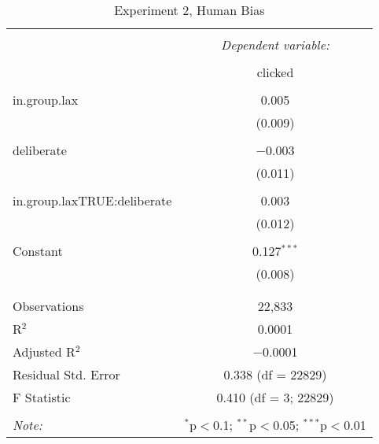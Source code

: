 
\begin{table}[!htbp] \centering 
  \caption{Experiment 2, Human Bias} 
  \label{} 
\begin{tabular}{@{\extracolsep{5pt}}lc} 
\\[-1.8ex]\hline 
\hline \\[-1.8ex] 
 & \multicolumn{1}{c}{\textit{Dependent variable:}} \\ 
\cline{2-2} 
\\[-1.8ex] & clicked \\ 
\hline \\[-1.8ex] 
 in.group.lax & 0.005 \\ 
  & (0.009) \\ 
  & \\ 
 deliberate & $-$0.003 \\ 
  & (0.011) \\ 
  & \\ 
 in.group.laxTRUE:deliberate & 0.003 \\ 
  & (0.012) \\ 
  & \\ 
 Constant & 0.127$^{***}$ \\ 
  & (0.008) \\ 
  & \\ 
\hline \\[-1.8ex] 
Observations & 22,833 \\ 
R$^{2}$ & 0.0001 \\ 
Adjusted R$^{2}$ & $-$0.0001 \\ 
Residual Std. Error & 0.338 (df = 22829) \\ 
F Statistic & 0.410 (df = 3; 22829) \\ 
\hline 
\hline \\[-1.8ex] 
\textit{Note:}  & \multicolumn{1}{r}{$^{*}$p$<$0.1; $^{**}$p$<$0.05; $^{***}$p$<$0.01} \\ 
\end{tabular} 
\end{table} 
